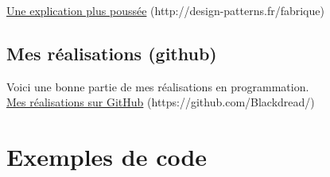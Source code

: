 \documentclass{report}
\begin{document}
\href{http://design-patterns.fr/fabrique}{Une explication plus poussée} (http://design-patterns.fr/fabrique)
\section{Mes réalisations (github)}\label{realisation}
Voici une bonne partie de mes réalisations en programmation.
\\
\href{https://github.com/Blackdread/}{Mes réalisations sur GitHub} (https://github.com/Blackdread/)
\\

\chapter{Exemples de code}
\end{document}
